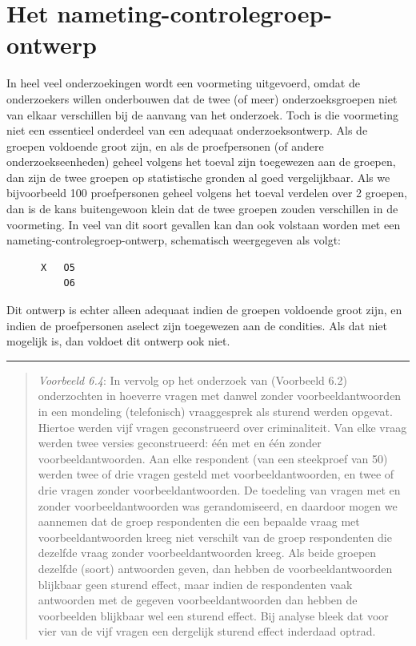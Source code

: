 \documentclass[
]{book}
\begin{document}
\hypertarget{het-nameting-controlegroep-ontwerp}{%
\section{Het nameting-controlegroep-ontwerp}\label{het-nameting-controlegroep-ontwerp}}

In heel veel onderzoekingen wordt een voormeting uitgevoerd, omdat de
onderzoekers willen onderbouwen dat de twee (of meer) onderzoeksgroepen
niet van elkaar verschillen bij de aanvang van het onderzoek. Toch is
die voormeting niet een essentieel onderdeel van een adequaat
onderzoeksontwerp. Als de groepen voldoende groot zijn, en als de
proefpersonen (of andere onderzoekseenheden) geheel volgens het toeval
zijn toegewezen aan de groepen, dan zijn de twee groepen op statistische
gronden al goed vergelijkbaar. Als we bijvoorbeeld 100 proefpersonen
geheel volgens het toeval verdelen over 2 groepen, dan is de kans
buitengewoon klein dat de twee groepen zouden verschillen in de
voormeting. In veel van dit soort gevallen kan dan ook volstaan worden
met een nameting-controlegroep-ontwerp, schematisch weergegeven als
volgt:

\begin{verbatim}
      X   O5
          O6
\end{verbatim}

Dit ontwerp is echter alleen adequaat indien de groepen voldoende groot
zijn, en indien de proefpersonen aselect zijn toegewezen aan de
condities. Als dat niet mogelijk is, dan voldoet dit ontwerp ook niet.

\begin{center}\rule{0.5\linewidth}{0.5pt}\end{center}

\begin{quote}
\emph{Voorbeeld 6.4}: In vervolg op het onderzoek van \citep{Houtk91}
(Voorbeeld 6.2)
onderzochten \citep{Wijff92} in hoeverre vragen met
danwel zonder voorbeeldantwoorden in een mondeling (telefonisch)
vraaggesprek als sturend werden opgevat. Hiertoe werden vijf vragen
geconstrueerd over criminaliteit. Van elke vraag werden twee versies
geconstrueerd: één met en één zonder voorbeeldantwoorden. Aan elke
respondent (van een steekproef van 50) werden twee of drie vragen
gesteld met voorbeeldantwoorden, en twee of drie vragen zonder
voorbeeldantwoorden. De toedeling van vragen met en zonder
voorbeeldantwoorden was gerandomiseerd, en daardoor mogen we aannemen
dat de groep respondenten die een bepaalde vraag met voorbeeldantwoorden
kreeg niet verschilt van de groep respondenten die dezelfde vraag zonder
voorbeeldantwoorden kreeg. Als beide groepen dezelfde (soort) antwoorden
geven, dan hebben de voorbeeldantwoorden blijkbaar geen sturend effect,
maar indien de respondenten vaak antwoorden met de gegeven
voorbeeldantwoorden dan hebben de voorbeelden blijkbaar wel een sturend
effect. Bij analyse bleek dat voor vier van de vijf vragen een dergelijk
sturend effect inderdaad optrad.
\end{quote}
\end{document}
